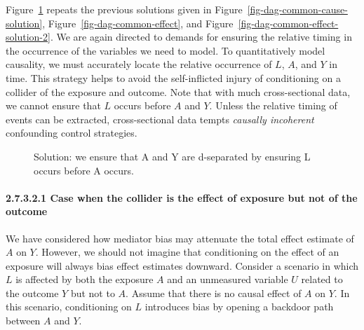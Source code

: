 \documentclass[
  singlecolumn]{article}
\let\oldparagraph\paragraph
\renewcommand{\paragraph}[1]{\oldparagraph{#1}\mbox{}}
\begin{document}
Figure~\ref{fig-dag-common-effect-solution-3} repeats the previous
solutions given in Figure~\ref{fig-dag-common-cause-solution},
Figure~\ref{fig-dag-common-effect}, and
Figure~\ref{fig-dag-common-effect-solution-2}. We are again directed to
demands for ensuring the relative timing in the occurrence of the
variables we need to model. To quantitatively model causality, we must
accurately locate the relative occurrence of \(L\), \(A\), and \(Y\) in
time. This strategy helps to avoid the self-inflicted injury of
conditioning on a collider of the exposure and outcome. Note that with
much cross-sectional data, we cannot ensure that \(L\) occurs before
\(A\) and \(Y\). Unless the relative timing of events can be extracted,
cross-sectional data tempts \emph{causally incoherent} confounding
control strategies.

\begin{figure}


\caption{\label{fig-dag-common-effect-solution-3}Solution: we ensure
that A and Y are d-separated by ensuring L occurs before A occurs.}

\end{figure}%

\paragraph{2.7.3.2.1 Case when the collider is the effect of exposure
but not of the
outcome}\label{case-when-the-collider-is-the-effect-of-exposure-but-not-of-the-outcome}

We have considered how mediator bias may attenuate the total effect
estimate of \(A\) on \(Y\). However, we should not imagine that
conditioning on the effect of an exposure will always bias effect
estimates downward. Consider a scenario in which \(L\) is affected by
both the exposure \(A\) and an unmeasured variable \(U\) related to the
outcome \(Y\) but not to \(A\). Assume that there is no causal effect of
\(A\) on \(Y\). In this scenario, conditioning on \(L\) introduces bias
by opening a backdoor path between \(A\) and \(Y\).
\end{document}
